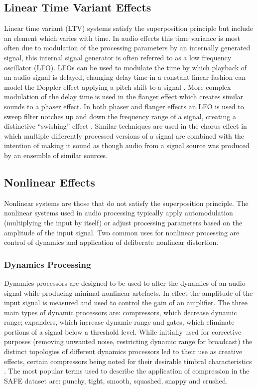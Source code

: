 	\subsection{Linear Time Variant Effects}
	\label{sec:Timbre-AudioProcessing-LTV}
		Linear time variant (LTV) systems satisfy the superposition principle but include an element which varies
		with time. In audio effects this time variance is most often due to modulation of the processing parameters
		by an internally generated signal, this internal signal generator is often referred to as a low frequency
		oscillator (LFO). LFOs can be used to modulate the time by which playback of an audio signal is delayed,
		changing delay time in a constant linear fashion can model the Doppler effect applying a pitch shift to a
		signal \citep{dattorro1997effect}. More complex modulation of the delay time is used in the flanger effect
		which creates similar sounds to a phaser effect. In both phaser and flanger effects an LFO is used to sweep
		filter notches up and down the frequency range of a signal, creating a distinctive ``swishing'' effect
		\citep{huber2010modern}. Similar techniques are used in the chorus effect in which multiple differently
		processed versions of a signal are combined with the intention of making it sound as though audio from a
		signal source was produced by an ensemble of similar sources.

	\subsection{Nonlinear Effects}
	\label{sec:Timbre-AudioProcessing-Nonlinear}
		Nonlinear systems are those that do not satisfy the superposition principle. The nonlinear systems used in
		audio processing typically apply automodulation (multiplying the input by itself) or adjust processing
		parameters based on the amplitude of the input signal. Two common uses for nonlinear processing are control
		of dynamics and application of deliberate nonlinear distortion.

		\subsubsection*{Dynamics Processing}
			Dynamics processors are designed to be used to alter the dynamics of an audio signal while
			producing minimal nonlinear artefacts. In effect the amplitude of the input signal is measured and
			used to control the gain of an amplifier. The three main types of dynamic processors are:
			compressors, which decrease dynamic range; expanders, which increase dynamic range and gates, which
			eliminate portions of a signal below a threshold level. While initially used for corrective
			purposes (removing unwanted noise, restricting dynamic range for broadcast) the distinct topologies
			of different dynamics processors led to their use as creative effects, certain compressors being
			noted for their desirable timbral characteristics \citep{moore2016an}. The most popular terms used
			to describe the application of compression in the SAFE dataset are: punchy, tight, smooth,
			squashed, snappy and crushed.

